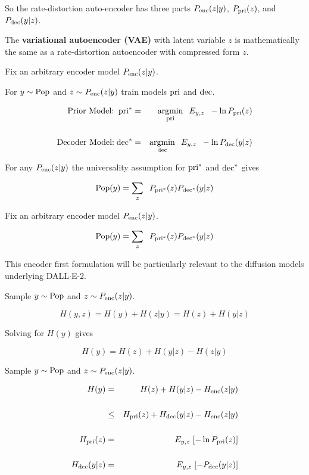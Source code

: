{\vfill
So the rate-distortion auto-encoder has three parts $P_{\mathrm{enc}}(z|y)$, $P_{\mathrm{pri}}(z)$, and $P_{\mathrm{dec}}(y|z)$.

\vfill
The {\bf variational autoencoder (VAE)} with latent variable $z$ is mathematically the same as a rate-distortion autoencoder
with compressed form $z$.



Fix an arbitrary encoder model $P_{\mathrm{enc}}(z|y)$.

\vfill
For $y \sim \mathrm{Pop}$ and $z \sim P_{\mathrm{enc}}(z|y)$ train models $\mathrm{pri}$ and $\mathrm{dec}$.

\begin{eqnarray*}
\mbox{Prior Model:}\;\;\mathrm{pri}^* & = & \operatorname*{argmin}_{\mathrm{pri}} \;\; E_{y,z}\;\;-\ln P_{\mathrm{pri}}(z) \\
\\
\mbox{Decoder Model:}\;\mathrm{dec}^* & = & \operatorname*{argmin}_{\mathrm{dec}}\;\; E_{y,z}\;\;-\ln P_{\mathrm{dec}}(y|z)
\end{eqnarray*}

\vfill
For any $P_{\mathrm{enc}}(z|y)$ the universality assumption for $\mathrm{pri}^*$ and $\mathrm{dec}^*$ gives

\vfill
$$\mathrm{Pop}(y) = \sum_z\;\;P_{\mathrm{pri}^*}(z)P_{\mathrm{dec}^*}(y|z)$$


Fix an arbitrary encoder model $P_{\mathrm{enc}}(z|y)$.

\vfill
$$\mathrm{Pop}(y) = \sum_z\;\;P_{\mathrm{pri}^*}(z)P_{\mathrm{dec}^*}(y|z)$$

\vfill
This encoder first formulation will be particularly relevant to the diffusion models underlying DALL$\cdot$E-2.


Sample $y \sim \mathrm{Pop}$ and $z \sim P_{\mathrm{enc}}(z|y)$.

\vfill
$$H(y,z) = H(y) + H(z|y) = H(z) + H(y|z)$$

\vfill
Solving for $H(y)$ gives

$$H(y) = H(z) + H(y|z) - H(z|y)$$

Sample $y \sim \mathrm{Pop}$ and $z \sim P_{\mathrm{enc}}(z|y)$.

\vfill
\begin{eqnarray*}
H(y) & = & H(z) + H(y|z) - H_{\mathrm{enc}}(z|y) \\
\\
 & \leq & H_{\mathrm{pri}}(z) + H_{\mathrm{dec}}(y|z) - H_{\mathrm{enc}}(z|y) \\
 \\
H_{\mathrm{pri}}(z) & = & E_{y,z}\;[-\ln P_{\mathrm{pri}}(z)] \\
\\
H_{\mathrm{dec}}(y|z) & = & E_{y,z}\;[- P_{\mathrm{dec}}(y|z)]
\end{eqnarray*}

}
